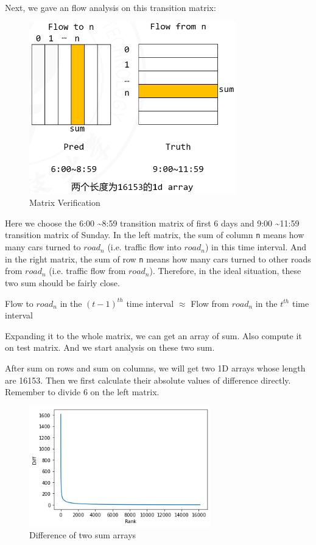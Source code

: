 \documentclass[fontset=none]{ctexart}
\theoremstyle{definition}
\theoremstyle{remark}
\begin{document}
\clearpage
Next, we gave an flow analysis on this transition matrix:
\begin{figure}[htb]
  \centering
  \includegraphics[width=0.8\textwidth]{images/8-2-0.png}
  \caption{Matrix Verification}
  \label{fig: 820}
\end{figure}

Here we choose the 6:00 \textasciitilde 8:59 transition matrix of first 6 days and 9:00 \textasciitilde  11:59 transition matrix of Sunday.
In the left matrix, the sum of column \texttt{n} means how many cars turned to $road_{n}$ (i.e. traffic flow into $road_{n}$) in this time interval.
And in the right matrix, the sum of row \texttt{n} means how many cars turned to other roads from $road_{n}$ (i.e. traffic flow from $road_{n}$).
Therefore, in the ideal situation, these two sum should be fairly close.
\begin{center}
  Flow to $road_n$ in the $(t-1)^{th}$ time interval $\approx$ Flow from $road_n$ in the $t^{th}$ time interval
\end{center}

Expanding it to the whole matrix, we can get an array of sum. Also compute it on test matrix. And we start analysis on these two sum.

\clearpage
After sum on rows and sum on columns, we will get two 1D arrays whose length are 16153.
Then we first calculate their absolute values of difference directly. Remember to divide 6 on the left matrix.
\begin{figure}[htb]
  \centering
  \includegraphics[width=0.7\textwidth]{images/8-2-1.png}
  \caption{Difference of two sum arrays}
  \label{fig: 821}
\end{figure}
\end{document}

